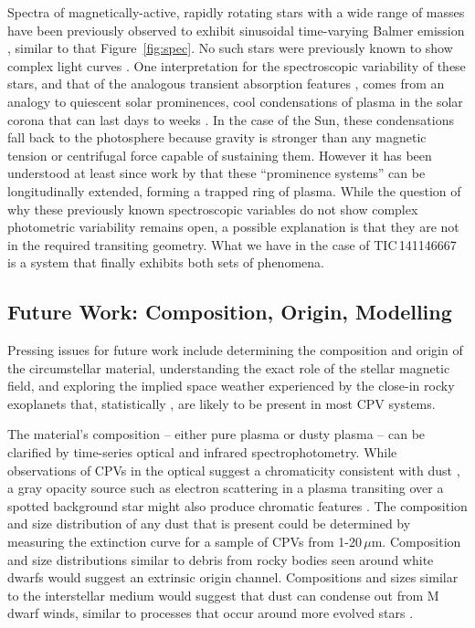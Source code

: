 \documentclass[11pt,twocolumn,tighten,linenumbers]{aastex7}
\begin{document}
Spectra of magnetically-active, rapidly rotating stars with a wide
range of masses have been previously observed to exhibit 
sinusoidal time-varying Balmer emission
\citep{Donati2000,Townsend2005,Dunstone2006,Skelly2008}, similar to
that Figure~\ref{fig:spec}.  No such stars were previously known to show
complex light curves \citep{Bouma2024}.   One interpretation for the
spectroscopic variability of these stars, and that of the analogous transient
absorption features
\citep{CollierCameron1989,CollierCameron1992,Cang2020}, comes from an
analogy to quiescent solar prominences, cool condensations of plasma
in the solar corona that can last days to weeks
\citep{VialEngvold2015}.  In the case of the Sun, these condensations
fall back to the photosphere because gravity is stronger than any
magnetic tension or centrifugal force capable of sustaining them.  
However it has been understood at least since work by
\citet{Donati2000} that these ``prominence systems'' can be
longitudinally extended, forming a trapped ring of plasma.
While the question of why these previously known spectroscopic
variables do not show complex photometric variability remains open,
a possible explanation is that they are not in the required transiting
geometry.
What we have in the case of TIC\,141146667 is a system that finally
exhibits both sets of phenomena.


\subsection{Future Work: Composition, Origin, Modelling}

Pressing issues for future work include determining the composition
and origin of the circumstellar material, understanding the exact role
of the stellar magnetic field, and exploring the implied space weather
experienced by the close-in rocky exoplanets that, statistically
\citep{Dressing2015}, are likely to be present in most CPV systems.

The material's composition -- either pure plasma or dusty plasma --
can be clarified by time-series optical and infrared
spectrophotometry.  While observations of CPVs in the optical suggest
a chromaticity consistent with dust
\citep{Tanimoto2020,Gunther2022,Koen2023}, a gray opacity source such
as electron scattering in a plasma transiting over a spotted
background star might also produce chromatic features
\citep{Rackham2018}.  The composition and size distribution of any dust
that is present could be determined by measuring the extinction curve
for a sample of CPVs from 1-20\,$\mu$m.  Composition and size
distributions similar to debris from rocky bodies seen around white
dwarfs \citep{Reach2009} would suggest an extrinsic origin channel.
Compositions and sizes similar to the interstellar medium would
suggest that dust can condense out from M dwarf winds, similar to
processes that occur around more evolved stars \citep{Marigo2008}.
\end{document}
